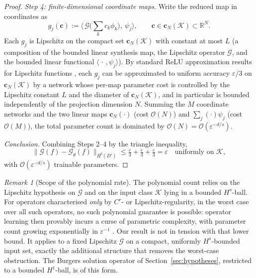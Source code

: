 \documentclass[11pt]{article}
\theoremstyle{plain}
\theoremstyle{definition}
\theoremstyle{remark}
\newtheorem{remark}[theorem]{Remark}
\begin{document}
\begin{proof}
\emph{Step 4: finite-dimensional coordinate maps.}
Write the reduced map in coordinates as
\[
  g_j(\mathbf{c}) := \big\langle\, \mathcal{G}\big(\textstyle\sum_k c_k\phi_k\big),\ \psi_j \big\rangle,
  \qquad \mathbf{c} \in \mathbf{c}_N(\mathcal{K}) \subset \mathbb{R}^N .
\]
Each $g_j$ is Lipschitz on the compact set $\mathbf{c}_N(\mathcal{K})$ with
constant at most $L$ (a composition of the bounded linear synthesis map, the
Lipschitz operator $\mathcal{G}$, and the bounded linear functional $\langle\,\cdot\,,\psi_j\rangle$). By standard ReLU approximation results for
Lipschitz functions \citep{yarotsky2017error}, each $g_j$ can be approximated to uniform accuracy $\varepsilon/3$ on $\mathbf{c}_N(\mathcal{K})$ by a network whose per-map
parameter cost is controlled by the Lipschitz constant $L$ and the diameter of $\mathbf{c}_N(\mathcal{K})$, and in particular is bounded independently of the
projection dimension $N$. Summing the $M$ coordinate networks and the two linear maps $\mathbf{c}_N(\cdot)$ (cost $\mathcal{O}(N)$) and $\sum_j(\cdot)\psi_j$ (cost $\mathcal{O}(M)$), the total parameter count is dominated by $\mathcal{O}(N) = \mathcal{O}(\varepsilon^{-d/s})$.

\emph{Conclusion.}
Combining Steps 2--4 by the triangle inequality,
\[
  \| \mathcal{G}(f) - \mathcal{G}_\theta(f) \|_{H^{t}(D')}
  \le \tfrac{\varepsilon}{3}+\tfrac{\varepsilon}{3}+\tfrac{\varepsilon}{3}
  = \varepsilon
  \quad\text{uniformly on }\mathcal{K},
\]
with $\mathcal{O}(\varepsilon^{-d/s})$ trainable parameters.
\end{proof}

\begin{remark}[Scope of the polynomial rate]
\label{rem:scope}
The polynomial count relies on the Lipschitz hypothesis on $\mathcal{G}$ and on the input class $\mathcal{K}$ lying in a bounded $H^{s}$-ball. For operators characterised \emph{only} by $C^{r}$- or Lipschitz-regularity, in the worst case over all such operators, no such polynomial guarantee is possible:
operator learning then provably incurs a curse of parametric complexity, with parameter count growing exponentially in $\varepsilon^{-1}$
\citep{lanthaler2026parametric}. Our result is not in tension with that lower bound. It applies to a fixed Lipschitz $\mathcal{G}$ on a compact, uniformly
$H^{s}$-bounded input set, exactly the additional structure that removes the worst-case obstruction. The Burgers solution operator of Section~\ref{sec:hypotheses}, restricted to a bounded $H^1$-ball, is of this form.
\end{remark}
\end{document}

